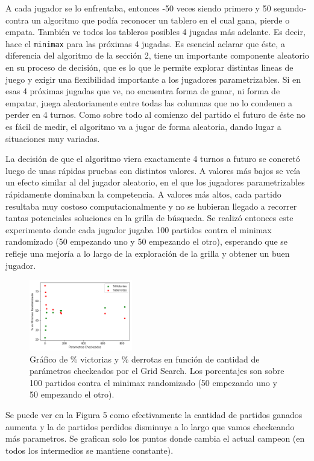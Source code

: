 \documentclass[A4paper,oneside,fleqn,11pt]{article}
\theoremstyle{definition}
\begin{document}
A cada jugador se lo enfrentaba, entonces -50 veces siendo primero y 50 segundo- contra un algoritmo que podía reconocer un tablero en el cual gana, pierde o empata. También ve todos los tableros posibles 4 jugadas más adelante. Es decir, hace el \texttt{minimax} para las próximas 4 jugadas. Es esencial aclarar que éste, a diferencia del algoritmo de la sección 2, tiene un importante componente aleatorio en su proceso de decisión, que es lo que le permite explorar distintas lineas de juego y exigir una flexibilidad importante a los jugadores parametrizables. Si en esas 4 próximas jugadas que ve, no encuentra forma de ganar, ni forma de empatar, juega aleatoriamente entre todas las columnas que no lo condenen a perder en 4 turnos. Como sobre todo al comienzo del partido el futuro de éste no es fácil de medir, el algoritmo va a jugar de forma aleatoria, dando lugar a situaciones muy variadas.

La decisión de que el algoritmo viera exactamente 4 turnos a futuro se concretó luego de unas rápidas pruebas con distintos valores. A valores más bajos se veía un efecto similar al del jugador aleatorio, en el que los jugadores parametrizables rápidamente dominaban la competencia. A valores más altos, cada partido resultaba muy costoso computacionalmente y no se hubieran llegado a recorrer tantas potenciales soluciones en la grilla de búsqueda. Se realizó entonces este experimento donde cada jugador jugaba 100 partidos contra el minimax randomizado (50 empezando uno y 50 empezando el otro), esperando que se refleje una mejoría a lo largo de la exploración de la grilla y obtener un buen jugador.


\begin{figure}
	\includegraphics[width=0.4\textwidth]{GridBack.png}
	\caption{ Gráfico de \% victorias y \% derrotas en función de cantidad de parámetros checkeados por el Grid Search. Los porcentajes son sobre 100 partidos contra el minimax randomizado (50 empezando uno y 50 empezando el otro).}
\end{figure}


Se puede ver en la Figura 5 como efectivamente la cantidad de partidos ganados aumenta y la de partidos perdidos disminuye a lo largo que vamos checkeando más parametros. Se grafican solo los puntos donde cambia el actual campeon (en todos los intermedios se mantiene constante).
\end{document}
